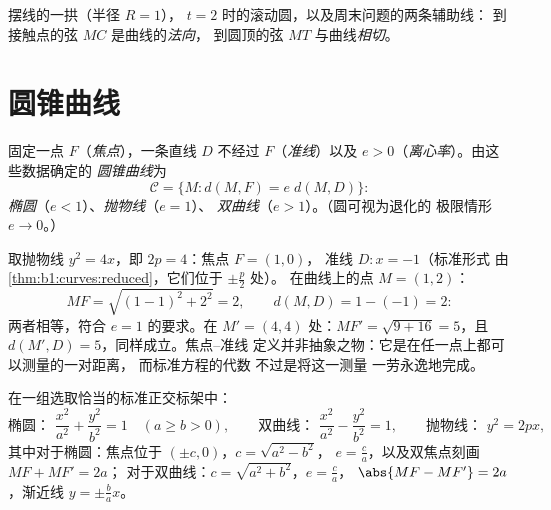 \begin{omfigure}

{\small 摆线的一拱（半径 $R = 1$），
$t = 2$ 时的滚动圆，以及周末问题的两条辅助线：
到接触点的弦 $MC$ 是曲线的\emph{法向}，
到圆顶的弦 $MT$ 与曲线\emph{相切}。}
\end{omfigure}

\section{圆锥曲线}

\begin{definition}[焦点--准线定义]\label{def:b1:curves:conics}
固定一点 $F$（\emph{焦点}），一条直线 $D$
不经过 $F$（\emph{准线}）以及 $e > 0$（\emph{离心率}）。由这些数据确定的
\emph{圆锥曲线}为
\[
\mathcal{C} = \{M : d(M, F) = e\; d(M, D)\}:
\]
\emph{椭圆}（$e < 1$）、\emph{抛物线}（$e = 1$）、
\emph{双曲线}（$e > 1$）。（圆可视为退化的
极限情形 $e \to 0$。）
\end{definition}

\begin{example}[在抛物线上检验定义]
\label{ex:b1:curves:parabolacheck}
取抛物线 $y^2 = 4x$，即 $2p = 4$：焦点 $F = (1, 0)$，
准线 $D : x = -1$（标准形式
由\cref{thm:b1:curves:reduced}，它们位于 $\pm\frac p2$ 处）。
在曲线上的点 $M = (1, 2)$：
\[
MF = \sqrt{(1-1)^2 + 2^2} = 2,
\qquad
d(M, D) = 1 - (-1) = 2 :
\]
两者相等，符合 $e = 1$ 的要求。在 $M' = (4, 4)$ 处：$MF' = \sqrt{9 +
16} = 5$，且 $d(M', D) = 5$，同样成立。焦点--准线
定义并非抽象之物：它是在任一点上都可以测量的一对距离，
而标准方程的代数
不过是将这一测量
一劳永逸地完成。
\end{example}

\begin{theorem}[标准方程]\label{thm:b1:curves:reduced}
在一组选取恰当的标准正交标架中：
\[
\text{椭圆： } \frac{x^2}{a^2} + \frac{y^2}{b^2} = 1
\quad (a \geq b > 0),
\qquad
\text{双曲线： } \frac{x^2}{a^2} - \frac{y^2}{b^2} = 1,
\qquad
\text{抛物线： } y^2 = 2px,
\]
其中对于椭圆：焦点位于 $(\pm c, 0)$，$c = \sqrt{a^2 - b^2}$，
$e = \frac ca$，以及双焦点刻画 $MF + MF' = 2a$；
对于双曲线：$c = \sqrt{a^2 + b^2}$，$e = \frac ca$，
$\abs{MF - MF'} = 2a$，渐近线 $y = \pm\frac ba x$。
\end{theorem}

